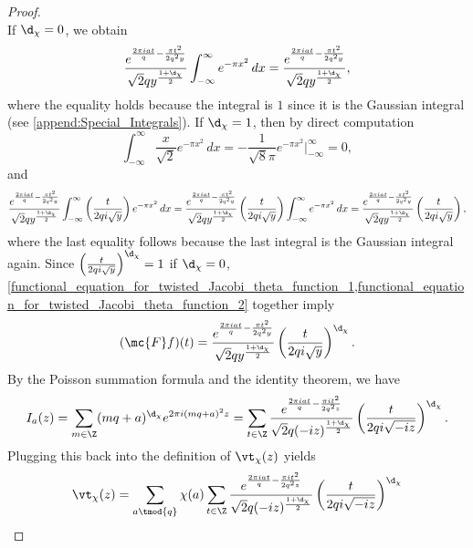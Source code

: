 \begin{proof}
\[        \]
        If $\d_{\chi} = 0$, we obtain
        \begin{equation}\label{functional_equation_for_twisted_Jacobi_theta_function_1}
          \frac{e^{\frac{2\pi iat}{q}-\frac{\pi t^{2}}{2q^{2}y}}}{\sqrt{2}qy^{\frac{1+\d_{\chi}}{2}}}\int_{-\infty}^{\infty}e^{-\pi x^{2}}\,dx = \frac{e^{\frac{2\pi iat}{q}-\frac{\pi t^{2}}{2q^{2}y}}}{\sqrt{2}qy^{\frac{1+\d_{\chi}}{2}}},
        \end{equation}
        where the equality holds because the integral is $1$ since it is the Gaussian integral (see \cref{append:Special_Integrals}). If $\d_{\chi} = 1$, then by direct computation
        \[
          \int_{-\infty}^{\infty}\frac{x}{\sqrt{2}}e^{-\pi x^{2}}\,dx = -\frac{1}{\sqrt{8}\pi}e^{-\pi x^{2}}\bigg|_{-\infty}^{\infty} = 0,
        \]
        and
        \begin{equation}\label{functional_equation_for_twisted_Jacobi_theta_function_2}
          \frac{e^{\frac{2\pi iat}{q}-\frac{\pi t^{2}}{2q^{2}y}}}{\sqrt{2}qy^{\frac{1+\d_{\chi}}{2}}}\int_{-\infty}^{\infty}\left(\frac{t}{2qi\sqrt{y}}\right)e^{-\pi x^{2}}\,dx = \frac{e^{\frac{2\pi iat}{q}-\frac{\pi t^{2}}{2q^{2}y}}}{\sqrt{2}qy^{\frac{1+\d_{\chi}}{2}}}\left(\frac{t}{2qi\sqrt{y}}\right)\int_{-\infty}^{\infty}e^{-\pi x^{2}}\,dx = \frac{e^{\frac{2\pi iat}{q}-\frac{\pi t^{2}}{2q^{2}y}}}{\sqrt{2}qy^{\frac{1+\d_{\chi}}{2}}}\left(\frac{t}{2qi\sqrt{y}}\right),
        \end{equation}
        where the last equality follows because the last integral is the Gaussian integral again. Since $\left(\frac{t}{2qi\sqrt{y}}\right)^{\d_{\chi}} = 1$ if $\d_{\chi} = 0$, \cref{functional_equation_for_twisted_Jacobi_theta_function_1,functional_equation_for_twisted_Jacobi_theta_function_2} together imply
        \[
          (\mc{F}f)(t) = \frac{e^{\frac{2\pi iat}{q}-\frac{\pi t^{2}}{2q^{2}y}}}{\sqrt{2}qy^{\frac{1+\d_{\chi}}{2}}}\left(\frac{t}{2qi\sqrt{y}}\right)^{\d_{\chi}}.
        \]
        By the Poisson summation formula and the identity theorem, we have
        \[
          I_{a}(z) = \sum_{m \in \Z}(mq+a)^{\d_{\chi}}e^{2\pi i(mq+a)^{2}z} = \sum_{t \in \Z}\frac{e^{\frac{2\pi iat}{q}-\frac{\pi it^{2}}{2q^{2}z}}}{\sqrt{2}q(-iz)^{\frac{1+\d_{\chi}}{2}}}\left(\frac{t}{2qi\sqrt{-iz}}\right)^{\d_{\chi}}.
        \]
        Plugging this back into the definition of $\vt_{\chi}(z)$ yields
        \begin{align*}
          \vt_{\chi}(z) &= \sum_{a \tmod{q}}\chi(a)\sum_{t \in \Z}\frac{e^{\frac{2\pi iat}{q}-\frac{\pi it^{2}}{2q^{2}z}}}{\sqrt{2}q(-iz)^{\frac{1+\d_{\chi}}{2}}}\left(\frac{t}{2qi\sqrt{-iz}}\right)^{\d_{\chi}} \\

\end{align*}
\end{proof}
